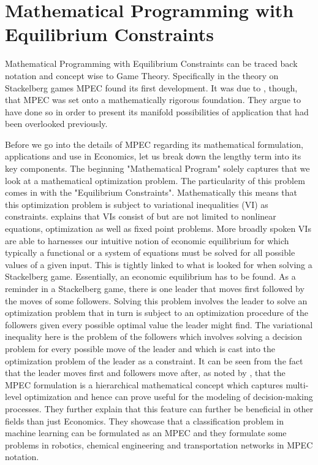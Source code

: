 \section{Mathematical Programming with Equilibrium Constraints} \label{generalMPEC}
\thispagestyle{plain} %

Mathematical Programming with Equilibrium Constraints can be traced back notation and concept wise to Game Theory. Specifically in the theory on Stackelberg games MPEC found its first development. It was due to \cite{Luo.Pang.Ralph.1996}, though, that MPEC was set onto a mathematically rigorous foundation. They argue to have done so in order to present its manifold possibilities of application that had been overlooked previously.

Before we go into the details of MPEC regarding its mathematical formulation, applications and use in Economics, let us break down the lengthy term into its key components. The beginning "Mathematical Program" solely captures that we look at a mathematical optimization problem. The particularity of this problem comes in with the "Equilibrium Constraints". Mathematically this means that this optimization problem is subject to variational inequalities (VI) as constraints. \cite{Nagurney.1993} explains that VIs consist of but are not limited to nonlinear equations, optimization as well as fixed point problems. More broadly spoken VIs are able to harnesses our intuitive notion of economic equilibrium for which typically a functional or a system of equations must be solved for all possible values of a given input. This is tightly linked to what is looked for when solving a Stackelberg game. Essentially, an economic equilibrium has to be found. As a reminder in a Stackelberg game, there is one leader that moves first followed by the moves of some followers. Solving this problem involves the leader to solve an optimization problem that in turn is subject to an optimization procedure of the followers given every possible optimal value the leader might find. The variational inequality here is the problem of the followers which involves solving a decision problem for every possible move of the leader and which is cast into the optimization problem of the leader as a constraint. It can be seen from the fact that the leader moves first and followers move after, as noted by \cite{Luo.Pang.Ralph.1996}, that the MPEC formulation is a hierarchical mathematical concept which captures multi-level optimization and hence can prove useful for the modeling of decision-making processes. They further explain that this feature can further be beneficial in other fields than just Economics. They showcase that a classification problem in machine learning can be formulated as an MPEC and they formulate some problems in robotics, chemical engineering and transportation networks in MPEC notation.

